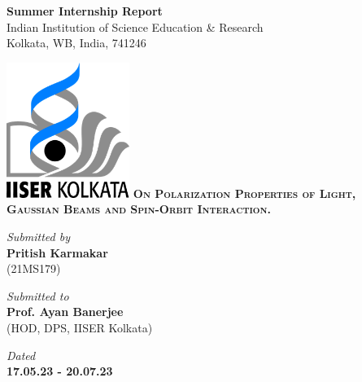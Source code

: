 \documentclass[11pt,a4paper]{article}
\author{Pritish Karmakar}
\numberwithin{equation}{section}
\begin{document}
	\begin{titlepage}
		\vspace*{1cm}
		\centering
		{\Huge\bfseries Summer Internship Report}\\
		\vspace{1cm}
		{\LARGE Indian Institution of Science Education \& Research}\\
		\vspace{3.5mm}
		{\LARGE Kolkata, WB, India, 741246}\\
		\vspace{5mm}
		
		\includegraphics[width=4cm]{iiserk.png}
		\vfill
		\textbf{\textsc{\LARGE 
				On Polarization Properties of Light,\\\vspace{2mm}
				Gaussian Beams and Spin-Orbit Interaction.}}\\
		
		\vspace{15mm}
		
		\textsl{\LARGE Submitted by}\\\vspace{2mm}
		\textbf{\huge Pritish Karmakar}\\\vspace{1.5mm}
		{\LARGE (21MS179)}\\
		\vspace{10mm}
		
		\textsl{\LARGE Submitted to}\\\vspace{3mm} 
		\textbf{\huge Prof. Ayan Banerjee}\\\vspace{1.5mm}
		{\LARGE (HOD, DPS, IISER Kolkata)}\\
		\vspace{10mm}
		
		\textsl{\LARGE Dated}\\\vspace{3mm} 
		\textbf{\huge17.05.23 - 20.07.23}\\
		\vspace{1cm}
		\clearpage
		

\end{titlepage}
\end{document}
